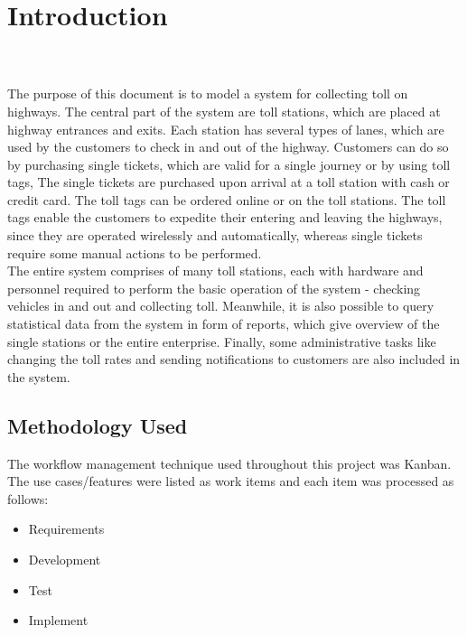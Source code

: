 \chapter{Introduction}
\trevon \\\\
\noindent
The purpose of this document is to model a system for collecting toll on highways. The central part of the system are toll stations, which are placed at highway entrances and exits. Each station has several types of lanes, which are used by the customers to check in and out of the highway. Customers can do so by purchasing single tickets, which are valid for a single journey or by using toll tags, The single tickets are purchased upon arrival at a toll station with cash or credit card. The toll tags can be ordered online or on the toll stations. The toll tags enable the customers to expedite their entering and leaving the highways, since they are operated wirelessly and automatically, whereas single tickets require some manual actions to be performed. \\ The entire system comprises of many toll stations, each with hardware and personnel required to perform the basic operation of the system - checking vehicles in and out and collecting toll. Meanwhile, it is also possible to query statistical data from the system in form of reports, which give overview of the single stations or the entire enterprise. Finally, some administrative tasks like changing the toll rates and sending notifications to customers are also included in the system.

\section{Methodology Used}
The workflow management technique used throughout this project was Kanban. The use cases/features were listed as work items and each item was processed as follows:

\begin{itemize}
  \item Requirements 
  \item Development
  \item Test
  \item Implement
\end{itemize}

